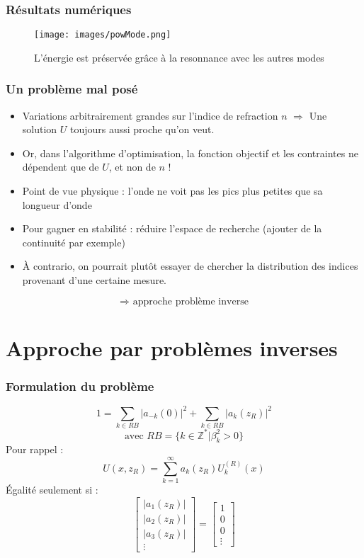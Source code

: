 \documentclass[handout, aspectratio=169]{beamer}
\begin{document}
\begin{frame}
	\frametitle{Résultats numériques}
\begin{figure}[!h]
	\centering
	\texttt{[image: images/powMode.png]}
	\caption{L'énergie est préservée grâce à la resonnance avec les autres modes}
	\label{fig:powMode}
\end{figure}
\end{frame}

\begin{frame}
	\frametitle{Un problème mal posé}
\begin{itemize}
	\item Variations arbitrairement grandes sur l'indice de refraction $n$ $\Rightarrow$ Une solution $U$ toujours aussi proche qu'on veut.
	\item Or, dans l'algorithme d'optimisation, la fonction objectif et les contraintes ne dépendent que de $U$, et non de $n$ !
	\item Point de vue physique : l'onde ne voit pas les pics plus petites que sa longueur d'onde
	\item Pour gagner en stabilité : réduire l'espace de recherche (ajouter de la continuité par exemple)
	\item À contrario, on pourrait plutôt essayer de chercher la distribution des indices provenant d'une certaine mesure.
\end{itemize}
\[\Rightarrow \text{ approche problème inverse}\]
\end{frame}

\section{Approche par problèmes inverses}
\begin{frame}
	\frametitle{Formulation du problème}
\[1=\sum_{k\in RB} |a_{-k}(0)|^2 + \sum_{k\in RB} |a_k(z_R)|^2 \]
\[\text{avec } RB=\{k\in \mathbb{Z}^* | \beta_k^2>0\}\]
Pour rappel :
	\[U(x,z_R)=\sum_{k=1}^\infty a_k(z_R)U_k^{(R)}(x)\]
Égalité seulement si :
\begin{equation}\label{eq23}
	\begin{bmatrix} |a_1(z_R)| \\ |a_2(z_R)| \\ |a_3(z_R)| \\ \vdots \end{bmatrix} = \begin{bmatrix} 1 \\ 0 \\ 0 \\ \vdots \end{bmatrix}
\end{equation}
\end{frame}
\end{document}

